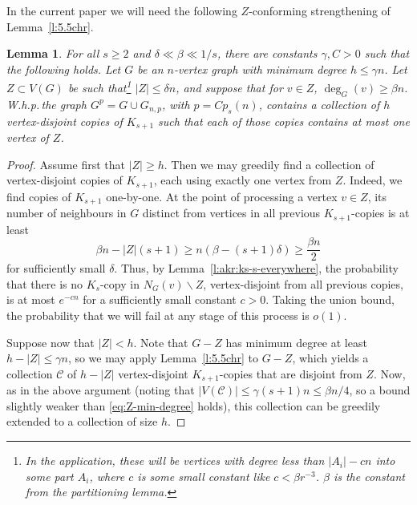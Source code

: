 \documentclass[reqno, 12pt]{amsart}
\numberwithin{equation}{section}
\numberwithin{figure}{section}
\theoremstyle{plain}
\newtheorem{lemma}[thm]{Lemma}
\theoremstyle{definition}
\def\cC{{\mathcal C}}
\def \Gnp{G_{n,p}}
\let\setminus=\smallsetminus
\begin{document}
    In the current paper we will need the following $Z$-conforming strengthening of Lemma~\ref{l:5.5chr}.
    
    \begin{lemma}\label{l:5.5chr-stronger}
        For all $s\geq 2$ and $\delta\ll\beta\ll 1/s$, there are constants $\gamma, C>0$ such that the following holds. Let $G$ be an $n$-vertex graph with minimum degree $h\leq \gamma n$. Let $Z\subset V(G)$ be such that\footnote{In the application, these will be vertices with degree less than $|A_i|-cn$ into some part $A_i$, where $c$ is some small constant like $c <\beta r^{-3}$. $\beta$ is the constant from the partitioning lemma.} $|Z| \leq \delta n$, and suppose that for $v \in Z$, $\deg_G(v) \geq \beta n$. W.h.p.\,the graph $G^p = G \cup \Gnp$, with $p = Cp_s(n)$, contains a collection of $h$ vertex-disjoint copies of $K_{s+1}$ such that each of those copies contains at most one vertex of $Z$.
    \end{lemma}
    
    \begin{proof}
        Assume first that $|Z|\geq h$. Then we may greedily find a collection of vertex-disjoint copies of $K_{s+1}$, each using exactly one vertex from $Z$. Indeed, we find copies of $K_{s+1}$ one-by-one. At the point of processing a vertex $v\in Z$, its number of neighbours in $G$ distinct from vertices in all previous $K_{s+1}$-copies is at least 
        \begin{equation}
                \beta n-|Z|(s+1)\geq n\left(\beta-(s+1)\delta\right)\geq \frac{\beta n}{2}
            \label{eq:Z-min-degree}
        \end{equation}
        for sufficiently small $\delta$. Thus, by Lemma~\ref{l:akr:ks-s-everywhere}, the probability that there is no $K_s$-copy in $N_G(v)\setminus Z$, vertex-disjoint from all previous copies, is at most $e^{-cn}$ for a sufficiently small constant $c>0$. Taking the union bound, the probability that we will fail at any stage of this process is $o(1)$.
        
        Suppose now that $|Z|<h$. Note that $G-Z$ has minimum degree at least $h-|Z|\leq\gamma n$, so we may apply Lemma~\ref{l:5.5chr} to $G-Z$, which yields a collection $\cC$ of $h-|Z|$ vertex-disjoint $K_{s+1}$-copies that are disjoint from $Z$. Now, as in the above argument (noting that $|V(\cC)|\leq \gamma (s+1)n\leq \beta n/4$, so a bound slightly weaker than \eqref{eq:Z-min-degree} holds), this collection can be greedily extended to a collection of size $h$.
    \end{proof}
\end{document}
